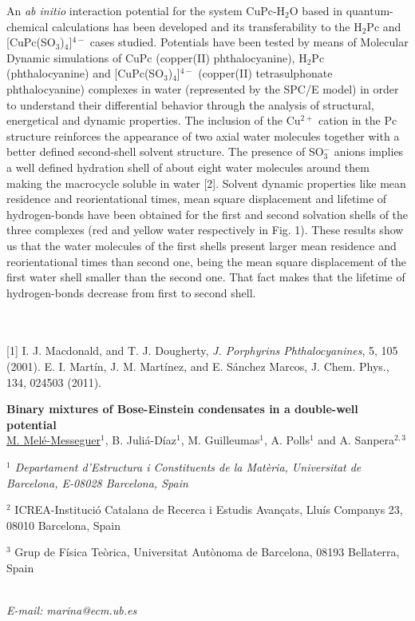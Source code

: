An \textit{ab initio} interaction potential for the system CuPc-H$_{2}$O based in quantum-chemical calculations has been developed and its transferability to the H$_{2}$Pc and [CuPc(SO$_{3}$)$_{4}$]$^{4-}$ cases studied.  Potentials have been tested by means of Molecular Dynamic simulations of CuPc (copper(II) phthalocyanine), H$_{2}$Pc (phthalocyanine) and [CuPc(SO$_{3}$)$_{4}$]$^{4-}$ (copper(II) tetrasulphonate phthalocyanine) complexes in water (represented by the SPC/E model) in order to understand their differential behavior through the analysis of structural, energetical and dynamic properties. The inclusion of the Cu$^{2+}$ cation in the Pc structure reinforces the appearance of two axial water molecules together with a better defined second-shell solvent structure. The presence of SO$_{3}^{-}$ anions implies a well defined hydration shell of about eight water molecules around them making the macrocycle soluble in water [2].  Solvent dynamic properties like mean residence and reorientational times, mean square displacement and lifetime of hydrogen-bonds have been obtained for the first and second solvation shells of the three complexes (red and yellow water respectively in Fig. 1). These results show us that the water molecules of the first shells present larger mean residence and reorientational times than second one, being the mean square displacement of the first water shell smaller than the second one. That fact makes that the lifetime of hydrogen-bonds decrease from first to second shell.
\begin{figure}[h]
 \centerline{}
 \caption[]{ }
\end{figure}
\\
\vspace{0.5cm}
\\
{\footnotesize
[1] I. J. Macdonald, and T. J. Dougherty, \textit{J. Porphyrins Phthalocyanines}, 5, 105 (2001).
\newline
[2] E. I. Martín, J. M. Martínez, and E. Sánchez Marcos, J. Chem. Phys., 134, 024503 (2011).
\newline
}
\newpage
\setcounter{figure}{0}
\begin{center}
{\bf \Large
Binary mixtures of Bose-Einstein condensates in a double-well potential
}
\\
\vspace{0.5cm}
\underline{M. Melé-Messeguer}$^{1}$, B. Juliá-Díaz$^{1}$, M. Guilleumas$^{1}$, A. Polls$^{1}$ and A. Sanpera$^{2,3}$
\\
\vspace{0.5cm}
{\it
$^{1}$  Departament d’Estructura i Constituents de la Matèria, Universitat de Barcelona, E-08028
Barcelona, Spain

$^{2}$ ICREA-Institució Catalana de Recerca i Estudis Avançats, Lluís Companys 23, 08010
Barcelona, Spain

$^{3}$ Grup de Física Teòrica, Universitat Autònoma de Barcelona, 08193 Bellaterra, Spain
}
\\
\vspace{0.5cm}
{\it E-mail: marina@ecm.ub.es}
\\
\vspace{0.5cm}
\end{center}
